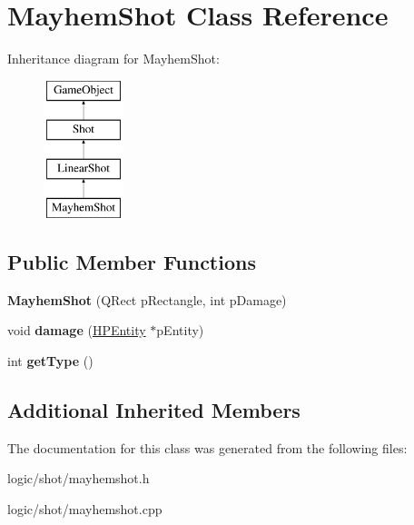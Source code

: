 \hypertarget{class_mayhem_shot}{\section{Mayhem\-Shot Class Reference}
\label{class_mayhem_shot}
}
Inheritance diagram for Mayhem\-Shot\-:\begin{figure}[H]
\begin{center}
\leavevmode
\includegraphics[height=4.000000cm]{class_mayhem_shot}
\end{center}
\end{figure}
\subsection*{Public Member Functions}
\begin{DoxyCompactItemize}
\item 
\hypertarget{class_mayhem_shot_a0f1115fcbf4c848347e7d9b91f36b730}{{\bfseries Mayhem\-Shot} (Q\-Rect p\-Rectangle, int p\-Damage)}\label{class_mayhem_shot_a0f1115fcbf4c848347e7d9b91f36b730}

\item 
\hypertarget{class_mayhem_shot_aae8e9c0bcac2eddc50774decf0fd7c2e}{void {\bfseries damage} (\hyperlink{class_h_p_entity}{H\-P\-Entity} $\ast$p\-Entity)}\label{class_mayhem_shot_aae8e9c0bcac2eddc50774decf0fd7c2e}

\item 
\hypertarget{class_mayhem_shot_a2aa6e9bf2e931477ace1731d3eed0500}{int {\bfseries get\-Type} ()}\label{class_mayhem_shot_a2aa6e9bf2e931477ace1731d3eed0500}

\end{DoxyCompactItemize}
\subsection*{Additional Inherited Members}


The documentation for this class was generated from the following files\-:\begin{DoxyCompactItemize}
\item 
logic/shot/mayhemshot.\-h\item 
logic/shot/mayhemshot.\-cpp\end{DoxyCompactItemize}
